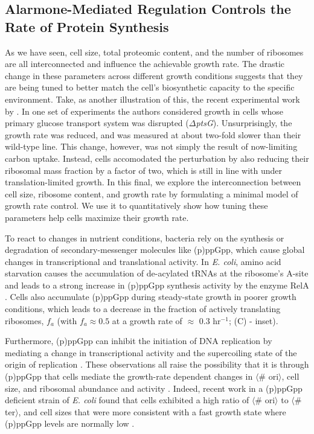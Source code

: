 
\subsection{Alarmone-Mediated Regulation Controls the Rate of Protein Synthesis}

As we have seen, cell size, total proteomic content, and the number of ribosomes
are all interconnected and influence the achievable growth rate. The drastic
change in these parameters across different growth conditions suggests that
they are being tuned to better match the cell's biosynthetic capacity to the
specific environment. Take, as another illustration of this, the recent
experimental work by \cite{dai2016}. In one set of experiments the authors
considered growth in cells whose primary glucose transport system was disrupted
($\Delta$\textit{ptsG}). Unsurprisingly, the growth rate was reduced, and was
measured at about two-fold slower than their wild-type line.  This change,
however, was not simply the result of now-limiting carbon uptake. Instead, cells
accomodated the perturbation by also reducing their ribosomal mass fraction by
a factor of two, which is still in line with 
under translation-limited growth.  In this final, we explore the interconnection
between cell size, ribosome content, and growth rate by formulating a minimal
model of growth rate control. We use it to quantitatively show how tuning these
parameters help cells maximize their growth rate.

To react to changes in nutrient conditions, bacteria rely on the synthesis or
degradation of secondary-messenger molecules  like (p)ppGpp, which cause global
changes in transcriptional and translational activity. In \textit{E. coli},
amino acid starvation causes the accumulation of de-acylated tRNAs at the
ribosome's A-site and leads to a strong increase in (p)ppGpp synthesis activity
by the enzyme RelA \citep{hauryliuk2015}. Cells also accumulate (p)ppGpp  during
steady-state growth in poorer growth conditions, which leads to a decrease in
the fraction of actively translating ribosomes, $f_a$  (with $f_a \approx 0.5$
at a growth rate of $\approx$ 0.3 hr$^{-1}$; (C) - inset).

Furthermore, (p)ppGpp can inhibit the initiation of DNA replication by mediating
a change in transcriptional activity and the supercoiling state of the origin of
replication \citep{kraemer2019}. These observations all raise the possibility
that it is through (p)ppGpp that cells mediate the growth-rate dependent changes
in $\langle$\# ori$\rangle$, cell size, and ribosomal abundance and activity
\citep{zhu2019, Buke2020}. Indeed, recent work in a (p)ppGpp deficient strain of
\textit{E. coli} found that cells exhibited a high ratio of $\langle$\#
ori$\rangle$ to $\langle$\# ter$\rangle$, and cell sizes that were more
consistent with a fast growth state where (p)ppGpp levels are normally low
\citep{fernandezcoll2020}.

